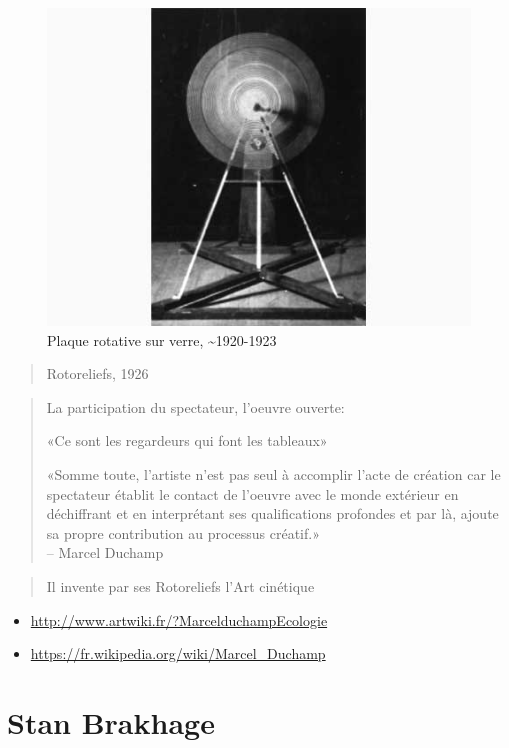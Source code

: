 \documentclass[
  french,
]{book}
\providecommand{\tightlist}{%
  \setlength{\itemsep}{0pt}\setlength{\parskip}{0pt}}
\begin{document}
\begin{figure}
\centering
\includegraphics{medias/corpus/duchamp/MarcelduchampEcologie_ducha_rotative_plaque_verre.jpg}
\caption{Plaque rotative sur verre, \textasciitilde1920-1923}
\end{figure}

\begin{quote}
Rotoreliefs, 1926
\end{quote}

\begin{quote}
La participation du spectateur, l'oeuvre ouverte:

«Ce sont les regardeurs qui font les tableaux»

«Somme toute, l'artiste n'est pas seul à accomplir l'acte de création car le spectateur établit le contact de l'oeuvre avec le monde extérieur en déchiffrant et en interprétant ses qualifications profondes et par là, ajoute sa propre contribution au processus créatif.»\\
-- Marcel Duchamp
\end{quote}

\begin{quote}
Il invente par ses Rotoreliefs l'Art cinétique
\end{quote}

\begin{itemize}
\tightlist
\item
  \url{http://www.artwiki.fr/?MarcelduchampEcologie}
\item
  \url{https://fr.wikipedia.org/wiki/Marcel_Duchamp}
\end{itemize}

\hypertarget{stan-brakhage}{%
\section{Stan Brakhage}\label{stan-brakhage}}
\end{document}
